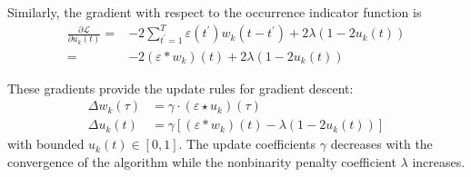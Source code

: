 \documentclass[10pt,twocolumn]{article}
\begin{document}
Similarly, the gradient with respect to the occurrence indicator function is
\begin{equation}
\begin{split}
\frac{\partial \mathcal L}{\partial u_k(t)} 
= & 
-2 \sum\limits_{t^\prime=1}^T \varepsilon(t^\prime) w_k(t-t^\prime) 
+ 2\lambda(1-2u_k(t))
\\
= &
-2 (\varepsilon*w_k)(t) 
+ 2\lambda(1-2u_k(t))
\end{split}
\end{equation}

These gradients provide the update rules for gradient descent: 
\begin{align}
\Delta w_k(\tau) &= \gamma\cdot(\varepsilon \star u_k)(\tau)
\\
\Delta u_k(t) &= \gamma\left[(\varepsilon * w_k)(t)
- \lambda (1-2u_k(t))\right]
\end{align}
with bounded $u_k(t)\in [0,1]$.
The update coefficients $\gamma$ decreases with the convergence of the algorithm while the nonbinarity penalty coefficient $\lambda$  increases.
\end{document}
